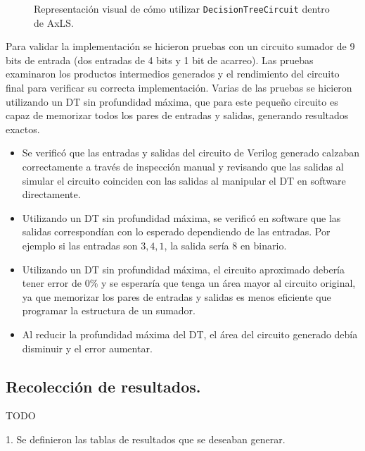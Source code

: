 \begin{figure}[htb]
  \centering
  
  \caption{Representación visual de cómo utilizar \texttt{DecisionTreeCircuit} dentro de AxLS.}
  \label{fig:flow}
\end{figure}

Para validar la implementación se hicieron pruebas con un circuito sumador de 9
bits de entrada (dos entradas de 4 bits y 1 bit de acarreo). Las pruebas
examinaron los productos intermedios generados y el rendimiento del circuito
final para verificar su correcta implementación. Varias de las pruebas se
hicieron utilizando un DT sin profundidad máxima, que para este pequeño
circuito es capaz de memorizar todos los pares de entradas y salidas, generando
resultados exactos.

\begin{itemize}
  \item Se verificó que las entradas y salidas del circuito de Verilog generado
    calzaban correctamente a través de inspección manual y revisando que las
    salidas al simular el circuito coinciden con las salidas al manipular el DT
    en software directamente.
  \item Utilizando un DT sin profundidad máxima, se verificó en software que
    las salidas correspondían con lo esperado dependiendo de las entradas. Por
    ejemplo si las entradas son ${3, 4, 1}$, la salida sería $8$ en binario.
  \item Utilizando un DT sin profundidad máxima, el circuito aproximado debería
    tener error de $0\%$ y se esperaría que tenga un área mayor al circuito
    original, ya que memorizar los pares de entradas y salidas es menos
    eficiente que programar la estructura de un sumador.
  \item Al reducir la profundidad máxima del DT, el área del circuito generado
    debía disminuir y el error aumentar.
\end{itemize}


\subsection{Recolección de resultados.}

 TODO

 1. Se definieron las tablas de resultados que se deseaban generar.


